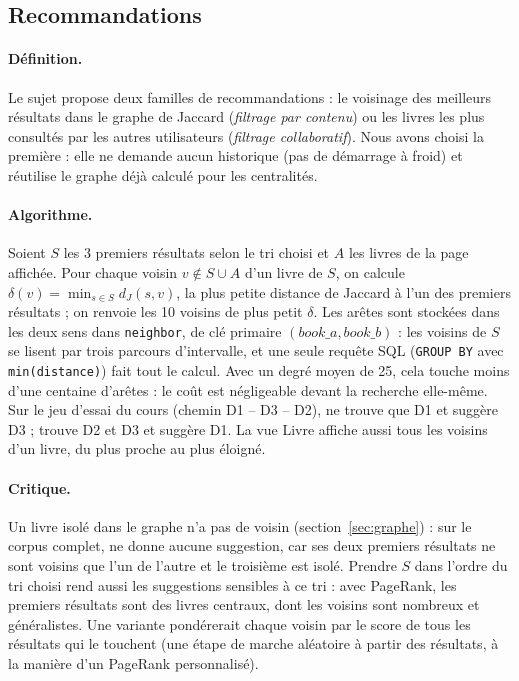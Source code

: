 \subsection{Recommandations}
\label{sec:recommandations}

\paragraph{Définition.} Le sujet propose deux familles de recommandations :
le voisinage des meilleurs résultats dans le graphe de Jaccard
(\emph{filtrage par contenu}) ou les livres les plus consultés par les autres
utilisateurs (\emph{filtrage collaboratif}). Nous avons choisi la
première : elle ne demande aucun historique (pas de démarrage à froid) et
réutilise le graphe déjà calculé pour les centralités.

\paragraph{Algorithme.} Soient $S$ les 3 premiers résultats selon le tri choisi
et $A$ les livres de la page affichée. Pour chaque voisin $v \notin S \cup A$
d'un livre de $S$, on calcule $\delta(v) = \min_{s \in S} d_J(s, v)$, la plus
petite distance de Jaccard à l'un des premiers résultats ; on renvoie les 10
voisins de plus petit $\delta$. Les arêtes sont stockées dans les deux sens dans
\texttt{neighbor}, de clé primaire $(\mathit{book\_a}, \mathit{book\_b})$ : les
voisins de $S$ se lisent par trois parcours d'intervalle, et une seule requête
SQL (\texttt{GROUP BY} avec \texttt{min(distance)}) fait tout le calcul. Avec un
degré moyen de 25, cela touche moins d'une centaine d'arêtes : le coût est
négligeable devant la recherche elle-même. Sur le jeu d'essai du cours (chemin
D1 -- D3 -- D2),  ne trouve que D1 et suggère D3 ; 
trouve D2 et D3 et suggère D1. La vue Livre affiche aussi tous les voisins d'un
livre, du plus proche au plus éloigné.

\paragraph{Critique.} Un livre isolé dans le graphe n'a pas de voisin
(section~\ref{sec:graphe}) : sur le corpus complet,  ne donne
aucune suggestion, car ses deux premiers résultats ne sont voisins que l'un de
l'autre et le troisième est isolé. Prendre $S$ dans l'ordre du tri choisi rend
aussi les suggestions sensibles à ce tri : avec PageRank, les premiers résultats
sont des livres centraux, dont les voisins sont nombreux et généralistes. Une
variante pondérerait chaque voisin par le score de tous les résultats qui le
touchent (une étape de marche aléatoire à partir des résultats, à la manière
d'un PageRank personnalisé).

